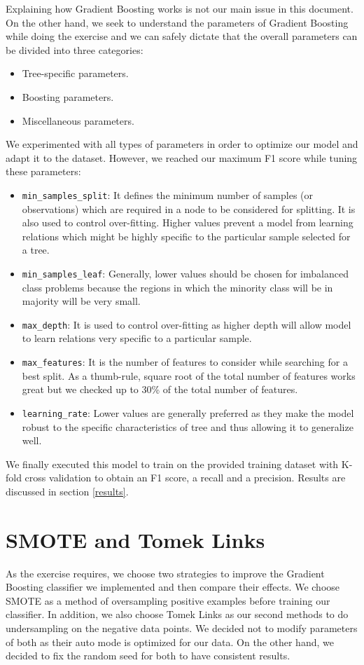 \documentclass{article}
\begin{document}
	Explaining how Gradient Boosting works is not our main issue in this document. On the other hand, we seek to understand the parameters of Gradient Boosting while doing the exercise and we can safely dictate that the overall parameters can be divided into three categories:
	\begin{itemize}
		\item Tree-specific parameters.
		\item Boosting parameters.
		\item Miscellaneous parameters.
	\end{itemize}
	We experimented with all types of parameters in order to optimize our model and adapt it to the dataset. However, we reached our maximum F1 score while tuning these parameters:
	\begin{itemize}
		\item \texttt{min\_samples\_split}: It defines the minimum number of samples (or observations) which are required in a node to be considered for splitting. It is also used to control over-fitting. Higher values prevent a model from learning relations which might be highly specific to the particular sample selected for a tree.
		\item \texttt{min\_samples\_leaf}: Generally, lower values should be chosen for imbalanced class problems because the regions in which the minority class will be in majority will be very small.
		\item \texttt{max\_depth}: It is used to control over-fitting as higher depth will allow model to learn relations very specific to a particular sample.
		\item \texttt{max\_features}: It is the number of features to consider while searching for a best split. As a thumb-rule, square root of the total number of features works great but we checked up to 30\% of the total number of features.
		\item \texttt{learning\_rate}: Lower values are generally preferred as they make the model robust to the specific characteristics of tree and thus allowing it to generalize well.
	\end{itemize}
	We finally executed this model to train on the provided training dataset with K-fold cross validation to obtain an F1 score, a recall and a precision. Results are discussed in section \ref{results}.

\section{SMOTE and Tomek Links}
	As the exercise requires, we choose two strategies to improve the Gradient Boosting classifier we implemented and then compare their effects. We choose SMOTE as a method of oversampling positive examples before training our classifier. In addition, we also choose Tomek Links as our second methods to do undersampling on the negative data points. We decided not to modify parameters of both as their auto mode is optimized for our data. On the other hand, we decided to fix the random seed for both to have consistent results.
\end{document}
